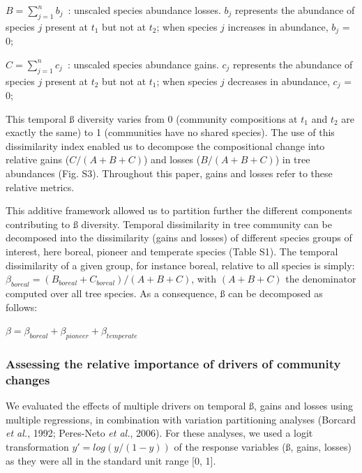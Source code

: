 \documentclass[a4paperpaper,]{article}
\begin{document}
\(B = \sum_{j=1}^n b_j\)~: unscaled species abundance losses. \(b_j\)
represents the abundance of species \(j\) present at \(t_1\) but not at
\(t_2\); when species \(j\) increases in abundance, \(b_j\) = 0;

\(C = \sum_{j=1}^n c_j\)~: unscaled species abundance gains. \(c_j\)
represents the abundance of species \(j\) present at \(t_2\) but not at
\(t_1\); when species \(j\) decreases in abundance, \(c_j\) = 0;

This temporal ß diversity varies from 0 (community compositions at
\(t_1\) and \(t_2\) are exactly the same) to 1 (communities have no
shared species). The use of this dissimilarity index enabled us to
decompose the compositional change into relative gains (\(C/(A+B+C)\))
and losses (\(B/(A+B+C)\)) in tree abundances (Fig. S3). Throughout this
paper, gains and losses refer to these relative metrics.

This additive framework allowed us to partition further the different
components contributing to ß diversity. Temporal dissimilarity in tree
community can be decomposed into the dissimilarity (gains and losses) of
different species groups of interest, here boreal, pioneer and temperate
species (Table S1). The temporal dissimilarity of a given group, for
instance boreal, relative to all species is simply:
\(\beta_{boreal} = (B_{boreal}+C_{boreal})/(A+B+C)\), with \((A+B+C)\)
the denominator computed over all tree species. As a consequence, ß can
be decomposed as follows:

\(\beta = \beta_{boreal} + \beta_{pioneer} + \beta_{temperate}\)

\hypertarget{assessing-the-relative-importance-of-drivers-of-community-changes}{%
\subsubsection{Assessing the relative importance of drivers of community
changes}\label{assessing-the-relative-importance-of-drivers-of-community-changes}}

We evaluated the effects of multiple drivers on temporal ß, gains and
losses using multiple regressions, in combination with variation
partitioning analyses (Borcard \emph{et al.}, 1992; Peres-Neto \emph{et
al.}, 2006). For these analyses, we used a logit transformation
\(y'=log(y/(1-y))\) of the response variables (ß, gains, losses) as they
were all in the standard unit range {[}0, 1{]}.
\end{document}
